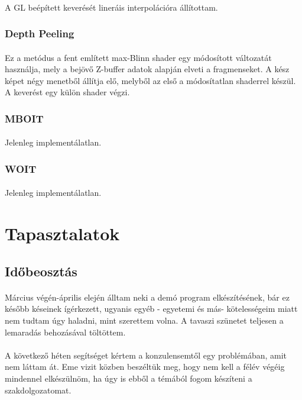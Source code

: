\paragraph{}A \ac{GL} beépített keverését lineráis interpolációra állítottam.
\subsubsection{Depth Peeling}
\paragraph{}Ez a metódus a fent említett max-Blinn shader egy módosított változatát használja, mely a bejövő Z-buffer adatok alapján elveti a fragmenseket. A kész képet négy menetből állítja elő, melyből az első a módosítatlan shaderrel készül. A keverést egy külön shader végzi.
\subsubsection{MBOIT}
\paragraph{}Jelenleg implementálatlan.
\subsubsection{WOIT}
\paragraph{}Jelenleg implementálatlan.

\newpage
\section{Tapasztalatok}
\subsection{Időbeosztás}
\paragraph{}Március végén-április elején álltam neki a demó program elkészítésének, bár ez később késeinek ígérkezett, ugyanis egyéb \-- egyetemi és más\-- kötelességeim miatt nem tudtam úgy haladni, mint szerettem volna. A tavaszi szünetet teljesen a lemaradás behozásával töltöttem.
\paragraph{}A következő héten segítséget kértem a konzulensemtől egy problémában, amit nem láttam át. Eme vizit közben beszéltük meg, hogy nem kell a félév végéig mindennel elkészülnöm, ha úgy is ebből a témából fogom készíteni a szakdolgozatomat.

